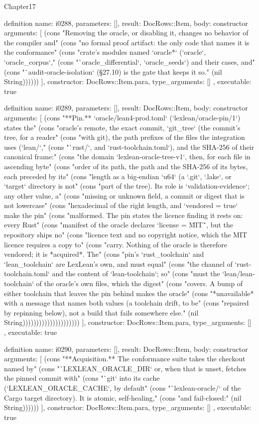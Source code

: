 \begin{lexlean}{Chapter17}
\begin{semanticmodule}
definition{
  name: i0288,
  parameters: [],
  result: DocRows::Item,
  body: constructor{
    arguments: [
      (cons "Removing the oracle, or disabling it, changes no behavior of the compiler and" (cons "no formal proof artifact: the only code that names it is the conformance" (cons "crate's modules named `oracle*` (`oracle`, `oracle_corpus`," (cons "`oracle_differential`, `oracle_seeds`) and their cases, and" (cons "`audit-oracle-isolation` (§27.10) is the gate that keeps it so." (nil String))))))
    ],
    constructor: DocRows::Item.para,
    type_arguments: []
  },
  executable: true
}

definition{
  name: i0289,
  parameters: [],
  result: DocRows::Item,
  body: constructor{
    arguments: [
      (cons "**Pin.** `oracle/lean4-prod.toml` (`lexlean/oracle-pin/1`) states the" (cons "oracle's remote, the exact commit, `git_tree` (the commit's tree, for a reader" (cons "with git), the path prefixes of the files the integration uses (`lean/`," (cons "`rust/`, and `rust-toolchain.toml`), and the SHA-256 of their canonical frame:" (cons "the domain `lexlean-oracle-tree-v1`, then, for each file in ascending byte" (cons "order of its path, the path and the SHA-256 of its bytes, each preceded by its" (cons "length as a big-endian `u64` (a `.git`, `.lake`, or `target` directory is not" (cons "part of the tree). Its role is `validation-evidence`; any other value, a" (cons "missing or unknown field, a commit or digest that is not lowercase" (cons "hexadecimal of the right length, and `vendored = true` make the pin" (cons "malformed. The pin states the licence finding it rests on: every Rust" (cons "manifest of the oracle declares `license = \"MIT\"`, but the repository ships no" (cons "licence text and no copyright notice, which the MIT licence requires a copy to" (cons "carry. Nothing of the oracle is therefore vendored; it is *acquired*. The" (cons "pin's `rust_toolchain` and `lean_toolchain` are LexLean's own, and must equal" (cons "the channel of `rust-toolchain.toml` and the content of `lean-toolchain`; so" (cons "must the `lean/lean-toolchain` of the oracle's own files, which the digest" (cons "covers. A bump of either toolchain that leaves the pin behind makes the oracle" (cons "*unavailable* with a message that names both values (a toolchain drift, to be" (cons "repaired by repinning below), not a build that fails somewhere else." (nil String)))))))))))))))))))))
    ],
    constructor: DocRows::Item.para,
    type_arguments: []
  },
  executable: true
}

definition{
  name: i0290,
  parameters: [],
  result: DocRows::Item,
  body: constructor{
    arguments: [
      (cons "**Acquisition.** The conformance suite takes the checkout named by" (cons "`LEXLEAN_ORACLE_DIR` or, when that is unset, fetches the pinned commit with" (cons "`git` into its cache (`LEXLEAN_ORACLE_CACHE`, by default" (cons "`lexlean-oracle/` of the Cargo target directory). It is atomic, self-healing," (cons "and fail-closed:" (nil String))))))
    ],
    constructor: DocRows::Item.para,
    type_arguments: []
  },
  executable: true
}


\end{semanticmodule}
\end{lexlean}
